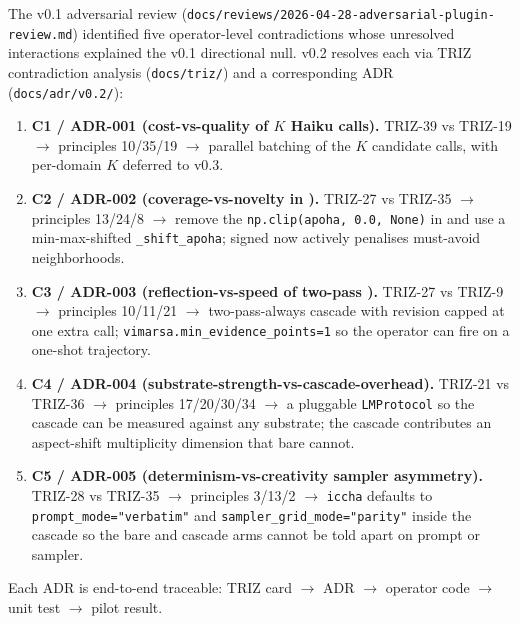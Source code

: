 The v0.1 adversarial review (\texttt{docs/reviews/2026-04-28-adversarial-plugin-review.md}) identified five operator-level contradictions whose unresolved interactions explained the v0.1 directional null. v0.2 resolves each via TRIZ contradiction analysis (\texttt{docs/triz/}) and a corresponding ADR (\texttt{docs/adr/v0.2/}):
\begin{enumerate}[leftmargin=1.4em]
  \item \textbf{C1 / ADR-001 (cost-vs-quality of $K$ Haiku calls).} TRIZ-39 vs TRIZ-19 $\to$ principles 10/35/19 $\to$ parallel batching of the $K$ candidate calls, with per-domain $K$ deferred to v0.3.
  \item \textbf{C2 / ADR-002 (coverage-vs-novelty in ).} TRIZ-27 vs TRIZ-35 $\to$ principles 13/24/8 $\to$ remove the \texttt{np.clip(apoha, 0.0, None)} in  and use a min-max-shifted \texttt{\_shift\_apoha}; signed  now actively penalises must-avoid neighborhoods.
  \item \textbf{C3 / ADR-003 (reflection-vs-speed of two-pass ).} TRIZ-27 vs TRIZ-9 $\to$ principles 10/11/21 $\to$ two-pass-always cascade with revision capped at one extra call; \texttt{vimarsa.min\_evidence\_points=1} so the operator can fire on a one-shot trajectory.
  \item \textbf{C4 / ADR-004 (substrate-strength-vs-cascade-overhead).} TRIZ-21 vs TRIZ-36 $\to$ principles 17/20/30/34 $\to$ a pluggable \texttt{LMProtocol} so the cascade can be measured against any substrate; the cascade contributes an aspect-shift multiplicity dimension that bare cannot.
  \item \textbf{C5 / ADR-005 (determinism-vs-creativity sampler asymmetry).} TRIZ-28 vs TRIZ-35 $\to$ principles 3/13/2 $\to$ \texttt{iccha} defaults to \texttt{prompt\_mode="verbatim"} and \texttt{sampler\_grid\_mode="parity"} inside the cascade so the bare and cascade arms cannot be told apart on prompt or sampler.
\end{enumerate}
Each ADR is end-to-end traceable: TRIZ card $\to$ ADR $\to$ operator code $\to$ unit test $\to$ pilot result.
